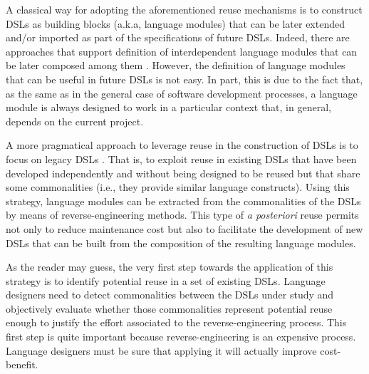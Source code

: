 A classical way for adopting the aforementioned reuse mechanisms is to construct DSLs as building blocks (a.k.a, language modules) that can be later extended and/or imported as part of the specifications of future DSLs. Indeed, there are approaches that support definition of interdependent language modules that can be later composed among them \cite{Vacchi:2015,Mernik:2013,Rumpe:2010}. However, the definition of language modules that can be useful in future DSLs is not easy. In part, this is due to the fact that, as the same as in the general case of software development processes, a language module is always designed to work in a particular context that, in general, depends on the current project. 

A more pragmatical approach to leverage reuse in the construction of DSLs is to focus on legacy DSLs \cite{degueule:2015}. That is, to exploit reuse in existing DSLs that have been developed independently and without being designed to be reused but that share some commonalities (i.e., they provide similar language constructs). Using this strategy, language modules can be extracted from the commonalities of the DSLs by means of reverse-engineering methods. This type of \textit{a posteriori} reuse permits not only to reduce maintenance cost but also to facilitate the development of new DSLs that can be built from the composition of the resulting language modules.

As the reader may guess, the very first step towards the application of this strategy is to identify potential reuse in a set of existing DSLs. Language designers need to detect commonalities between the DSLs under study and objectively evaluate whether those commonalities represent potential reuse enough to justify the effort associated to the reverse-engineering process. This first step is quite important because reverse-engineering is an expensive process. Language designers must be sure that applying it will actually improve cost-benefit. 


